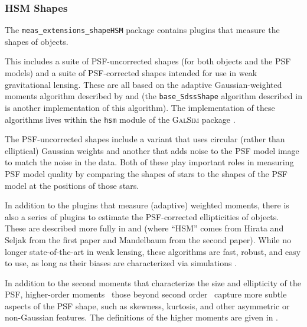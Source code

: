 \subsubsection{HSM Shapes}
\label{sec:hsm}

The \texttt{meas\_extensions\_shapeHSM} package contains plugins that measure the shapes of objects.

This includes a suite of PSF-uncorrected shapes (for both objects and the PSF models) and a suite of PSF-corrected shapes intended for use in weak gravitational lensing.
These are all based on the adaptive Gaussian-weighted moments algorithm described by \citet{2002AJ....123..583B} and \citet{2000AJ....120.1198F} (the \texttt{base\_SdssShape} algorithm described in  is another implementation of this algorithm).
The implementation of these algorithms lives within the \texttt{hsm} module of the \textsc{GalSim} package \citep{2015A&C....10..121R}.

The PSF-uncorrected shapes include a variant that uses circular (rather than elliptical) Gaussian weights and another that adds noise to the PSF model image to match the noise in the data.
Both of these play important roles in measuring PSF model quality by comparing the shapes of stars to the shapes of the PSF model at the positions of those stars.

In addition to the plugins that measure (adaptive) weighted moments, there is also a series of plugins to estimate the PSF-corrected ellipticities of objects.
These are described more fully in \citet{2003MNRAS.343..459H} and \citet{2005MNRAS.361.1287M} (where ``HSM'' comes from Hirata and Seljak from the first paper and Mandelbaum from the second paper).
While no longer state-of-the-art in weak lensing, these algorithms are fast, robust, and easy to use, as long as their biases are characterized via simulations \citep{2018PASJ...70S..25M, 2022PASJ...74..421L}.

In addition to the second moments that characterize the size and ellipticity of the PSF, higher-order moments \textemdash\ those beyond second order \textemdash\ capture more subtle aspects of the PSF shape, such as skewness, kurtosis, and other asymmetric or non-Gaussian features.
The definitions of the higher moments are given in \citet{2023MNRAS.520.2328Z}.
